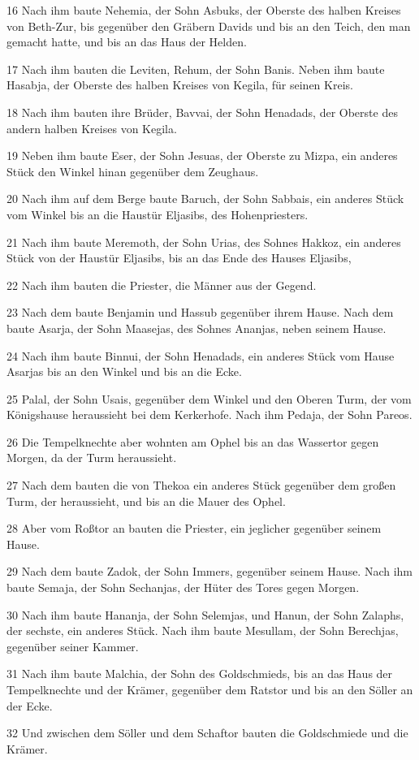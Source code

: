 \par 16 Nach ihm baute Nehemia, der Sohn Asbuks, der Oberste des halben Kreises von Beth-Zur, bis gegenüber den Gräbern Davids und bis an den Teich, den man gemacht hatte, und bis an das Haus der Helden.
\par 17 Nach ihm bauten die Leviten, Rehum, der Sohn Banis. Neben ihm baute Hasabja, der Oberste des halben Kreises von Kegila, für seinen Kreis.
\par 18 Nach ihm bauten ihre Brüder, Bavvai, der Sohn Henadads, der Oberste des andern halben Kreises von Kegila.
\par 19 Neben ihm baute Eser, der Sohn Jesuas, der Oberste zu Mizpa, ein anderes Stück den Winkel hinan gegenüber dem Zeughaus.
\par 20 Nach ihm auf dem Berge baute Baruch, der Sohn Sabbais, ein anderes Stück vom Winkel bis an die Haustür Eljasibs, des Hohenpriesters.
\par 21 Nach ihm baute Meremoth, der Sohn Urias, des Sohnes Hakkoz, ein anderes Stück von der Haustür Eljasibs, bis an das Ende des Hauses Eljasibs,
\par 22 Nach ihm bauten die Priester, die Männer aus der Gegend.
\par 23 Nach dem baute Benjamin und Hassub gegenüber ihrem Hause. Nach dem baute Asarja, der Sohn Maasejas, des Sohnes Ananjas, neben seinem Hause.
\par 24 Nach ihm baute Binnui, der Sohn Henadads, ein anderes Stück vom Hause Asarjas bis an den Winkel und bis an die Ecke.
\par 25 Palal, der Sohn Usais, gegenüber dem Winkel und den Oberen Turm, der vom Königshause heraussieht bei dem Kerkerhofe. Nach ihm Pedaja, der Sohn Pareos.
\par 26 Die Tempelknechte aber wohnten am Ophel bis an das Wassertor gegen Morgen, da der Turm heraussieht.
\par 27 Nach dem bauten die von Thekoa ein anderes Stück gegenüber dem großen Turm, der heraussieht, und bis an die Mauer des Ophel.
\par 28 Aber vom Roßtor an bauten die Priester, ein jeglicher gegenüber seinem Hause.
\par 29 Nach dem baute Zadok, der Sohn Immers, gegenüber seinem Hause. Nach ihm baute Semaja, der Sohn Sechanjas, der Hüter des Tores gegen Morgen.
\par 30 Nach ihm baute Hananja, der Sohn Selemjas, und Hanun, der Sohn Zalaphs, der sechste, ein anderes Stück. Nach ihm baute Mesullam, der Sohn Berechjas, gegenüber seiner Kammer.
\par 31 Nach ihm baute Malchia, der Sohn des Goldschmieds, bis an das Haus der Tempelknechte und der Krämer, gegenüber dem Ratstor und bis an den Söller an der Ecke.
\par 32 Und zwischen dem Söller und dem Schaftor bauten die Goldschmiede und die Krämer.

